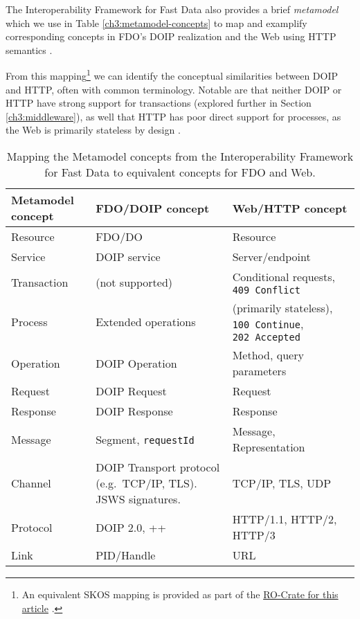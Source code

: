 The Interoperability Framework for Fast Data also provides a brief \emph{metamodel} which we use in Table \vref{ch3:metamodel-concepts} to map and examplify corresponding concepts in FDO's DOIP realization and the Web using HTTP semantics \cite{Fielding 2022}.

From this mapping\footnote{An equivalent \acrshort{SKOS} mapping \cite{Isaac 2009} is provided as part of the \href{https://w3id.org/ro/doi/10.5281/zenodo.8075229}{RO-Crate for this article} \cite{Soiland-Reyes 2023a}.} we can identify the conceptual similarities between DOIP and HTTP, often with common terminology. Notable are that neither DOIP or HTTP have strong support for transactions (explored further in Section \vref{ch3:middleware}), as well that HTTP has poor direct support for processes, as the Web is primarily stateless by design \cite{Fielding 2000}.

\begin{table}[htp]
  \centering
  \caption[Mapping the Interoperability Framework Metamodel concepts to FDO and Web]{Mapping the Metamodel concepts from the Interoperability Framework for Fast Data \cite{Delgado 2016} to equivalent concepts for FDO and Web.
  \label{ch3:metamodel-concepts}}\tabularnewline
   \begin{tabular}{ m{5em}  m{15em} m{15em} } 
   \hline
  Metamodel concept & 
  FDO/DOIP concept & 
  Web/HTTP concept \\ 
   \hline
  Resource	  & FDO/DO	            & Resource \\
  Service	    & DOIP service	      & Server/endpoint \\
  Transaction	& (not supported)	    & Conditional requests, \texttt{409\ Conflict} \\
  Process	    & Extended operations	& (primarily stateless), \texttt{100\ Continue}, \texttt{202\ Accepted} \\
  Operation	  & DOIP Operation	    & Method, query parameters \\
  Request	    & DOIP Request	      & Request \\
  Response	  & DOIP Response	      & Response \\
  Message	    & Segment, \texttt{requestId} 
                                    & Message, Representation \\
  Channel	    & DOIP Transport protocol (e.g.~TCP/IP, TLS). JSWS signatures.
                                    & \acrshort{TCP}/\acrshort{IP}, \acrshort{TLS}, \acrshort{UDP} \\
  Protocol  	& DOIP 2.0, ++	      & \acrshort{HTTP}/1.1, HTTP/2, HTTP/3 \\
  Link	      & \acrshort{PID}/\acrshort{Handle}	        & \acrshort{URL} \\ 
   \hline
   \end{tabular}\end{table}
  

